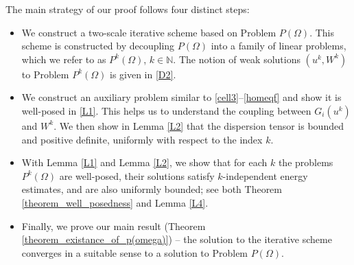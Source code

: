 \documentclass[11pt]{article}
\begin{document}
The main strategy of our proof follows four distinct steps:
\begin{itemize}[leftmargin=1.37cm]
    \item[Step 1:]  We construct a two-scale iterative scheme based on Problem $P(\Omega)$.
    This scheme is constructed by decoupling $P(\Omega)$ into a family of linear problems, which we refer to as $P^k(\Omega)$, $k\in\mathbb{N}$.
    The notion of weak solutions $(u^k,W^k)$ to Problem $P^k(\Omega)$ is given in \cref{D2}.
    \item[Step 2:] We construct an auxiliary problem similar to \eqref{cell3}--\eqref{homeqf} and show it is well-posed in \cref{L1}.
    This helps us to understand the coupling between $G_i(u^k)$ and $W^k$.
    We then show in Lemma \ref{L2} that the dispersion tensor is bounded and positive definite, uniformly with respect to the index $k$.
    \item[Step 3:] With Lemma \ref{L1} and Lemma \ref{L2}, we show that for each $k$ the problems $P^k(\Omega)$ are well-posed, their solutions satisfy $k$-independent energy estimates, and are also uniformly bounded; see both Theorem \ref{theorem_well_posedness} and Lemma \ref{L4}.
    \item[Step 4:] Finally, we prove our main result (Theorem  \ref{theorem_existance_of_p(omega)}) -- the solution to the iterative scheme converges in a suitable sense to a solution to Problem $P(\Omega)$.
\end{itemize}
\end{document}
